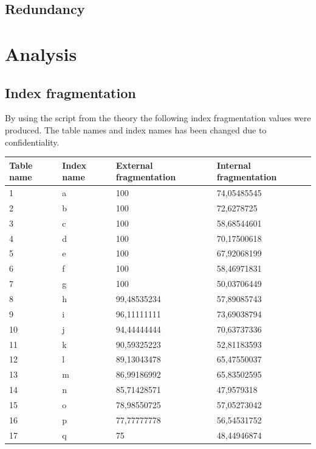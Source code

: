 \documentclass{cslthse-msc}
\begin{document}
\subsection{Redundancy}

\section{Analysis}

\subsection{Index fragmentation}
By using the script from the theory the following index fragmentation values were produced. The table names and index names has been changed due to confidentiality.

\begin{table}[H]
\begin{center}
\begin{tabular}{|l|l|l|l|}
\hline
Table name & Index name & External fragmentation & Internal fragmentation \\ \hline 
1  & a & 100         & 74,05485545 \\ \hline
2  & b & 100         & 72,6278725  \\ \hline
3  & c & 100         & 58,68544601 \\ \hline
4  & d & 100         & 70,17500618 \\ \hline
5  & e & 100         & 67,92068199 \\ \hline
6  & f & 100         & 58,46971831 \\ \hline
7  & g & 100         & 50,03706449 \\ \hline
8  & h & 99,48535234 & 57,89085743 \\ \hline
9  & i & 96,11111111 & 73,69038794 \\ \hline
10 & j & 94,44444444 & 70,63737336 \\ \hline
11 & k & 90,59325223 & 52,81183593 \\ \hline
12 & l & 89,13043478 & 65,47550037 \\ \hline
13 & m & 86,99186992 & 65,83502595 \\ \hline
14 & n & 85,71428571 & 47,9579318  \\ \hline
15 & o & 78,98550725 & 57,05273042 \\ \hline
16 & p & 77,77777778 & 56,54531752 \\ \hline
17 & q & 75          & 48,44946874 \\ \hline

\end{tabular}
\end{center}
\end{table}
\end{document}
